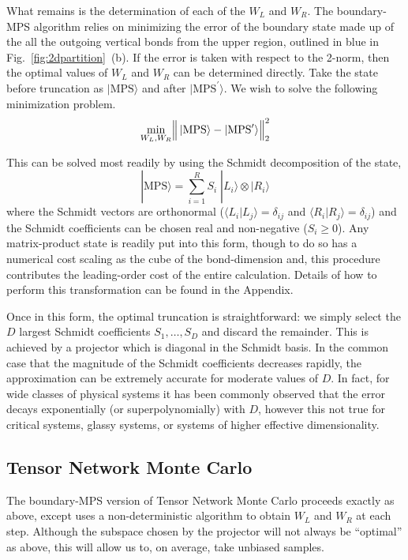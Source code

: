 \documentclass[aps,prl,nopacs,twocolumn]{revtex4}
\newcommand {\Fig}[1] {Fig.~\ref{#1}}
\begin{document}
What remains is the determination of each of the $W_L$ and $W_R$. The boundary-MPS algorithm relies on minimizing the error of the boundary state made up of the all the outgoing vertical bonds from the upper region, outlined in blue in \Fig{fig:2dpartition}~(b). If the error is taken with respect to the 2-norm, then the optimal values of $W_L$ and $W_R$ can be determined directly. Take the state before truncation as $|\mathrm{MPS}\rangle$ and after $|\mathrm{MPS}^{\prime}\rangle$. We wish to solve the following minimization problem.
\begin{equation}
    \min_{W_L,W_R} \Bigl\| \, |\mathrm{MPS}\rangle - |\mathrm{MPS}^{\prime}\rangle \Bigr\|^2_2 \label{2norm}
\end{equation}

This can be solved most readily by using the Schmidt decomposition of the state,
\begin{equation}
    |\mathrm{MPS}\rangle = \sum_{i=1}^R S_i \; |L_i\rangle \otimes |R_i\rangle \label{schmidt}
\end{equation}
where the Schmidt vectors are orthonormal ($\langle L_i|L_j\rangle = \delta_{ij}$ and $\langle R_i|R_j\rangle = \delta_{ij}$) and the Schmidt coefficients can be chosen real and non-negative ($S_i \ge 0$). Any matrix-product state is readily put into this form, though to do so has a numerical cost scaling as the cube of the bond-dimension and, this procedure contributes the leading-order cost of the entire calculation. Details of how to perform this transformation can be found in the Appendix.

Once in this form, the optimal truncation is straightforward: we simply select the $D$ largest Schmidt coefficients $S_1,\dots,S_D$ and discard the remainder. This is achieved by a projector which is diagonal in the Schmidt basis. In the common case that the magnitude of the Schmidt coefficients decreases rapidly, the approximation can be extremely accurate for moderate values of $D$. In fact, for wide classes of physical systems it has been commonly observed that the error decays exponentially (or superpolynomially) with $D$, however this not true for critical systems, glassy systems, or systems of higher effective dimensionality. 

\subsection{Tensor Network Monte Carlo}

The boundary-MPS version of Tensor Network Monte Carlo proceeds exactly as above, except uses a non-deterministic algorithm to obtain $W_L$ and $W_R$ at each step. Although the subspace chosen by the projector will not always be ``optimal'' as above, this will allow us to, on average, take unbiased samples. 
\end{document}
